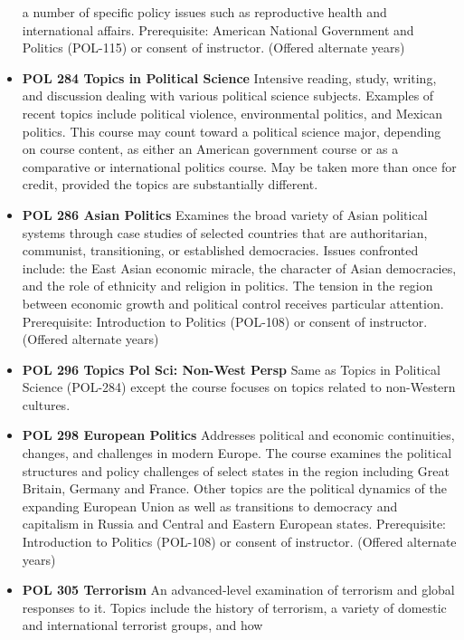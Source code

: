 \documentclass[
  letterpaper,
]{scrbook}
\begin{document}
\begin{itemize}
  a number of specific policy issues such as reproductive health and
  international affairs. Prerequisite: American National Government and
  Politics (POL-115) or consent of instructor. (Offered alternate years)
\item
  \textbf{POL 284 Topics in Political Science} Intensive reading, study,
  writing, and discussion dealing with various political science
  subjects. Examples of recent topics include political violence,
  environmental politics, and Mexican politics. This course may count
  toward a political science major, depending on course content, as
  either an American government course or as a comparative or
  international politics course. May be taken more than once for credit,
  provided the topics are substantially different.
\item
  \textbf{POL 286 Asian Politics} Examines the broad variety of Asian
  political systems through case studies of selected countries that are
  authoritarian, communist, transitioning, or established democracies.
  Issues confronted include: the East Asian economic miracle, the
  character of Asian democracies, and the role of ethnicity and religion
  in politics. The tension in the region between economic growth and
  political control receives particular attention. Prerequisite:
  Introduction to Politics (POL-108) or consent of instructor. (Offered
  alternate years)\\
\item
  \textbf{POL 296 Topics Pol Sci: Non-West Persp} Same as Topics in
  Political Science (POL-284) except the course focuses on topics
  related to non-Western cultures.\\
\item
  \textbf{POL 298 European Politics} Addresses political and economic
  continuities, changes, and challenges in modern Europe. The course
  examines the political structures and policy challenges of select
  states in the region including Great Britain, Germany and France.
  Other topics are the political dynamics of the expanding European
  Union as well as transitions to democracy and capitalism in Russia and
  Central and Eastern European states. Prerequisite: Introduction to
  Politics (POL-108) or consent of instructor. (Offered alternate
  years)\\
\item
  \textbf{POL 305 Terrorism} An advanced-level examination of terrorism
  and global responses to it. Topics include the history of terrorism, a
  variety of domestic and international terrorist groups, and how

\end{itemize}
\end{document}
